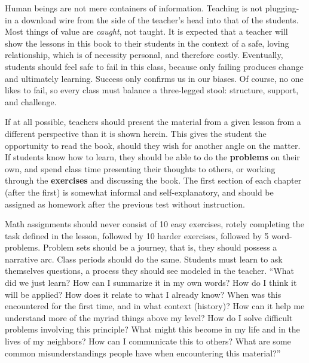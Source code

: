 
Human beings are not mere containers of information.  Teaching is not plugging-in
a download wire from the side of the teacher's head into that of the students.  Most
things of value are \emph{caught}, not taught.  It is expected that a teacher will show the 
lessons in this book to their students in the context of a safe, loving relationship, which
is of necessity personal, and therefore costly.  Eventually, students should feel safe to
fail in this class, because only failing produces change and ultimately learning.  Success
only confirms us in our biases.
Of course, no one likes to fail, so every class must balance a three-legged stool: structure, 
support, and challenge.

If at all possible, teachers should present the material from a given lesson from a different
perspective than it is shown herein.  This gives the student the opportunity to read the book,
should they wish for another angle on the matter.  If students know how to learn, they should
be able to do the \textbf{problems} on their own, and spend class time presenting their 
thoughts to others, or working through the \textbf{exercises} and discussing the book.  
The first section of each chapter (after the first) is somewhat informal and self-explanatory, 
and should be assigned as homework after the previous test without instruction.

Math assignments should never consist of 10 easy exercises, rotely completing the task defined
in the lesson, followed by 10 harder exercises, followed by 5 word-problems.  Problem sets
should be a journey, that is, they should possess a narrative arc.  Class periods should do the same.
Students must learn to ask themselves questions, a process they should see modeled in the
teacher.
``What did we just learn?  How can I summarize it in my own words?  How do I think it
will be applied?  How does it relate to what I already know?  When was this encountered
for the first time, and in what context (history)? How can it help me 
understand more of the myriad things above my level?  How do I solve difficult problems
involving this principle? What might this become in my life and in the lives of my
neighbors?  How can I communicate this to others?  What are some common misunderstandings
people have when encountering this material?''

